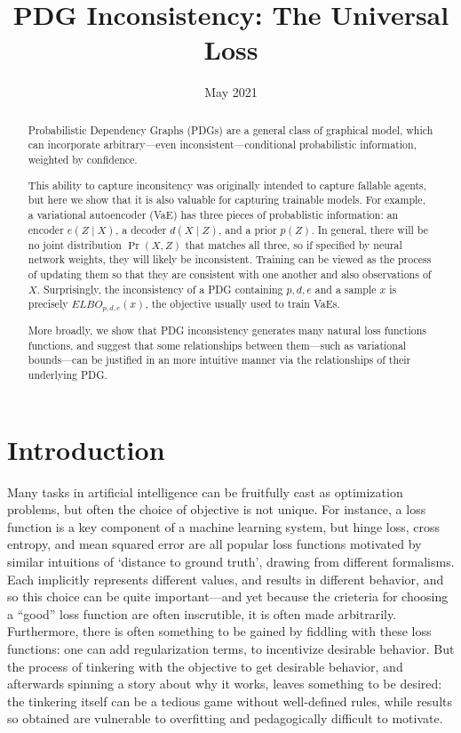 \documentclass{article}
\title{PDG Inconsistency: The Universal Loss}
\date{May 2021}
\theoremstyle{plain}
\theoremstyle{definition}
\begin{document}
\maketitle


\begin{abstract}
	Probabilistic Dependency Graphs (PDGs) are a general class of graphical model, which can incorporate arbitrary---even inconsistent---conditional probabilistic information, weighted by confidence.

	This ability to capture inconsitency was originally intended to capture fallable agents,
	but here we show that it is also valuable for capturing trainable models.
	For example, a variational autoencoder (VaE)
	has three pieces of probablistic information: an encoder $e(Z \mid X)$, a decoder $d(X \mid Z)$, and a prior $p(Z)$. In general, there will be no joint distribution $\Pr(X,Z)$ that matches all three, so if specified by neural network weights, they will likely be inconsistent. Training can be viewed as the process of updating them so that they are consistent with one another and also observations of $X$.
	Surprisingly, the inconsistency of a PDG containing $p,d,e$ and a sample $x$ is precisely $\mathit{ELBO}_{p,d,e}(x)$, the objective usually used to train VaEs.

	More broadly, we show that PDG inconsistency generates many natural loss functions functions, and suggest that some relationships between them---such as variational bounds---can be justified in an more intuitive manner via the relationships of their underlying PDG.
\end{abstract}

\section{Introduction}
Many tasks in artificial intelligence can be fruitfully cast as optimization problems, but often the choice of objective is not unique.
For instance, a loss function is a key component of a machine learning system, but hinge loss, cross entropy, and mean squared error are all popular loss functions motivated by similar intuitions of `distance to ground truth', drawing from different formalisms.
Each implicitly represents different values, and results in different behavior, and so this choice can be quite important---and yet because the crieteria for choosing a ``good'' loss function are often inscrutible, it is often made arbitrarily.
Furthermore, there is often something to be gained by fiddling with these loss functions: one can add regularization terms, to incentivize desirable behavior.
But the process of tinkering with the objective to get desirable behavior, and afterwards spinning a story about why it works, leaves something to be desired:
the tinkering itself can be a tedious game without well-defined rules, while results so obtained are vulnerable to overfitting and pedagogically difficult to motivate.
%
\end{document}
